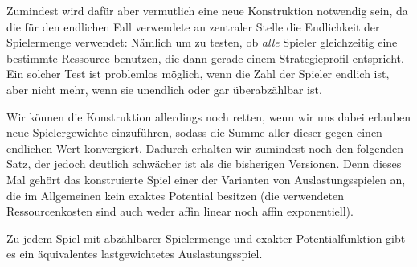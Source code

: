 Zumindest wird dafür aber vermutlich eine neue Konstruktion notwendig sein, da die für den endlichen Fall verwendete an zentraler Stelle die Endlichkeit der Spielermenge verwendet: Nämlich um zu testen, ob \emph{alle} Spieler gleichzeitig eine bestimmte Ressource benutzen, die dann gerade einem Strategieprofil entspricht. Ein solcher Test ist problemlos möglich, wenn die Zahl der Spieler endlich ist, aber nicht mehr, wenn sie unendlich oder gar überabzählbar ist.

Wir können die Konstruktion allerdings noch retten, wenn wir uns dabei erlauben neue Spielergewichte einzuführen, sodass die Summe aller dieser gegen einen endlichen Wert konvergiert. Dadurch erhalten wir zumindest noch den folgenden Satz, der jedoch deutlich schwächer ist als die bisherigen Versionen. Denn dieses Mal gehört das konstruierte Spiel einer der Varianten von Auslastungsspielen an, die im Allgemeinen kein exaktes Potential besitzen (die verwendeten Ressourcenkosten sind auch weder affin linear noch affin exponentiell).

\begin{satz}\label{satz:ReprAbzbarerExPotspieleDurchLastgewAusl}
	Zu jedem Spiel mit abzählbarer Spielermenge und exakter Potentialfunktion gibt es ein äquivalentes lastgewichtetes Auslastungsspiel.
\end{satz}

